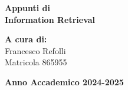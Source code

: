 \documentclass[a4paper,12pt,oneside]{book}
\begin{document}
    
    \begin{titlepage}
        
	\vspace{40mm}
        
	\begin{center}
            {\LARGE{
                    \textbf{Appunti di \\ Information Retrieval}
                    \par
            }}
        \end{center}
        
        \vspace{50mm}

        \begin{flushright}
            {\large \textbf{A cura di:}} \\
            \large{Francesco Refolli} \\
            \large{Matricola 865955} 
        \end{flushright}
        
        \vspace{40mm}
        \begin{center}
            {\large{\bf Anno Accademico 2024-2025}}
        \end{center}

        \restoregeometry
        
    \end{titlepage}
    
    \printindex

    
\end{document}
